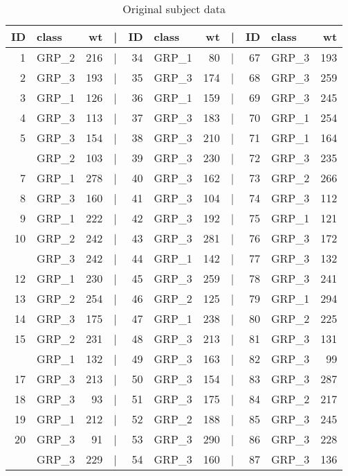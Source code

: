 \documentclass[smallextended]{svjour3}       %
\begin{document}
\begin{table}

\caption{\label{tab:subject-weights}Original subject data}
\centering
\begin{tabular}[t]{rlrlrlrlrlr}
\toprule
ID & class & wt & | & ID & class & wt & | & ID & class & wt\\
\midrule
1 & GRP\_2 & 216 & | & 34 & GRP\_1 & 80 & | & 67 & GRP\_3 & 193\\
2 & GRP\_3 & 193 & | & 35 & GRP\_3 & 174 & | & 68 & GRP\_3 & 259\\
3 & GRP\_1 & 126 & | & 36 & GRP\_1 & 159 & | & 69 & GRP\_3 & 245\\
4 & GRP\_3 & 113 & | & 37 & GRP\_3 & 183 & | & 70 & GRP\_1 & 254\\
5 & GRP\_3 & 154 & | & 38 & GRP\_3 & 210 & | & 71 & GRP\_1 & 164\\
\addlinespace
6 & GRP\_2 & 103 & | & 39 & GRP\_3 & 230 & | & 72 & GRP\_3 & 235\\
7 & GRP\_1 & 278 & | & 40 & GRP\_3 & 162 & | & 73 & GRP\_2 & 266\\
8 & GRP\_3 & 160 & | & 41 & GRP\_3 & 104 & | & 74 & GRP\_3 & 112\\
9 & GRP\_1 & 222 & | & 42 & GRP\_3 & 192 & | & 75 & GRP\_1 & 121\\
10 & GRP\_2 & 242 & | & 43 & GRP\_3 & 281 & | & 76 & GRP\_3 & 172\\
\addlinespace
11 & GRP\_3 & 242 & | & 44 & GRP\_1 & 142 & | & 77 & GRP\_3 & 132\\
12 & GRP\_1 & 230 & | & 45 & GRP\_3 & 259 & | & 78 & GRP\_3 & 241\\
13 & GRP\_2 & 254 & | & 46 & GRP\_2 & 125 & | & 79 & GRP\_1 & 294\\
14 & GRP\_3 & 175 & | & 47 & GRP\_1 & 238 & | & 80 & GRP\_2 & 225\\
15 & GRP\_2 & 231 & | & 48 & GRP\_3 & 213 & | & 81 & GRP\_3 & 131\\
\addlinespace
16 & GRP\_1 & 132 & | & 49 & GRP\_3 & 163 & | & 82 & GRP\_3 & 99\\
17 & GRP\_3 & 213 & | & 50 & GRP\_3 & 154 & | & 83 & GRP\_3 & 287\\
18 & GRP\_3 & 93 & | & 51 & GRP\_3 & 175 & | & 84 & GRP\_2 & 217\\
19 & GRP\_1 & 212 & | & 52 & GRP\_2 & 188 & | & 85 & GRP\_3 & 245\\
20 & GRP\_3 & 91 & | & 53 & GRP\_3 & 290 & | & 86 & GRP\_3 & 228\\
\addlinespace
21 & GRP\_3 & 229 & | & 54 & GRP\_3 & 160 & | & 87 & GRP\_3 & 136\\

\end{tabular}
\end{table}
\end{document}
